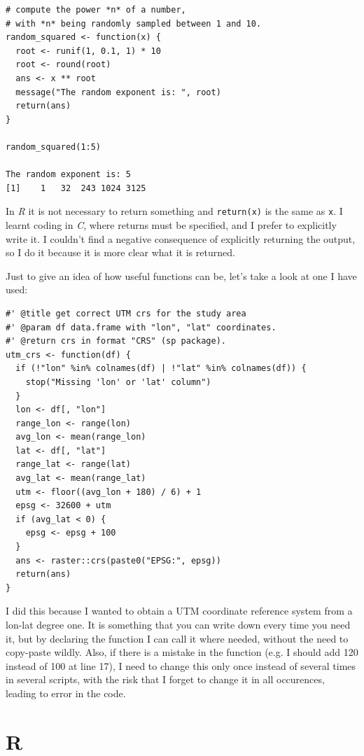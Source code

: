 \documentclass{book}
\begin{document}
\begin{lstlisting}[showstringspaces=false]
# compute the power *n* of a number,
# with *n* being randomly sampled between 1 and 10.
random_squared <- function(x) {
  root <- runif(1, 0.1, 1) * 10
  root <- round(root)
  ans <- x ** root
  message("The random exponent is: ", root)
  return(ans)
}

random_squared(1:5)

The random exponent is: 5
[1]    1   32  243 1024 3125
\end{lstlisting}

In \textit{R} it is not necessary to return something and \texttt{return(x)} is the same as \texttt{x}. I learnt coding in \textit{C}, where returns must be specified, and I prefer to explicitly write it. I couldn't find a negative consequence of explicitly returning the output, so I do it because it is more clear what it is returned.

Just to give an idea of how useful functions can be, let's take a look at one I have used:

\begin{lstlisting}[showstringspaces=false]
#' @title get correct UTM crs for the study area
#' @param df data.frame with "lon", "lat" coordinates.
#' @return crs in format "CRS" (sp package).
utm_crs <- function(df) {
  if (!"lon" %in% colnames(df) | !"lat" %in% colnames(df)) {
    stop("Missing 'lon' or 'lat' column")
  }
  lon <- df[, "lon"]
  range_lon <- range(lon)
  avg_lon <- mean(range_lon)
  lat <- df[, "lat"]
  range_lat <- range(lat)
  avg_lat <- mean(range_lat)
  utm <- floor((avg_lon + 180) / 6) + 1
  epsg <- 32600 + utm
  if (avg_lat < 0) {
    epsg <- epsg + 100
  }
  ans <- raster::crs(paste0("EPSG:", epsg))
  return(ans)
}

\end{lstlisting}

I did this because I wanted to obtain a UTM coordinate reference system from a lon-lat degree one. It is something that you can write down every time you need it, but by declaring the function I can call it where needed, without the need to copy-paste wildly. Also, if there is a mistake in the function (e.g. I should add 120 instead of 100 at line 17), I need to change this only once instead of several times in several scripts, with the risk that I forget to change it in all occurences, leading to error in the code.

\chapter{R}
\end{document}
